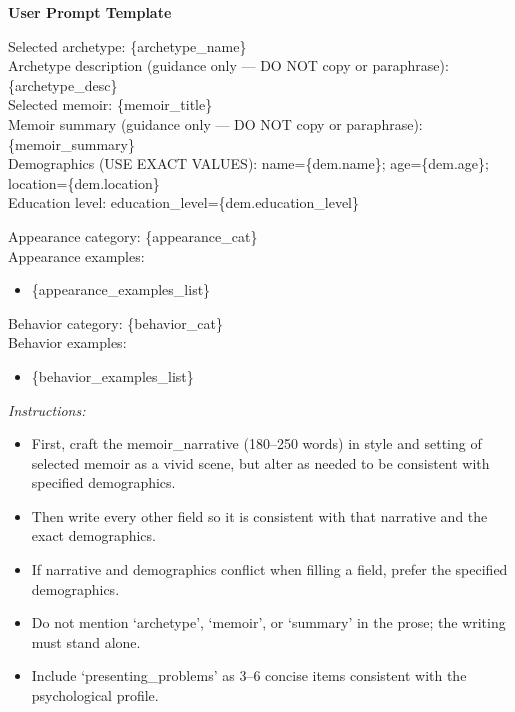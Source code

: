 \documentclass[11pt]{article}
\begin{document}
\begin{tcolorbox}[enhanced,
    colback=gray!5,
    colframe=black!75,
    fonttitle=\bfseries,
    title={Persona User Prompt Template},
    breakable,
    boxrule=0.6pt
]
\small
\textbf{User Prompt Template}\par
Selected archetype: \{archetype\_name\}\\
Archetype description (guidance only --- DO NOT copy or paraphrase): \{archetype\_desc\}\\
Selected memoir: \{memoir\_title\}\\
Memoir summary (guidance only --- DO NOT copy or paraphrase): \{memoir\_summary\}\\
Demographics (USE EXACT VALUES): name=\{dem.name\}; age=\{dem.age\}; location=\{dem.location\}\\
Education level: education\_level=\{dem.education\_level\}

\medskip
Appearance category: \{appearance\_cat\}\\
Appearance examples:
\begin{itemize}\itemsep2pt
\item \{appearance\_examples\_list\}
\end{itemize}

Behavior category: \{behavior\_cat\}\\
Behavior examples:
\begin{itemize}\itemsep2pt
\item \{behavior\_examples\_list\}
\end{itemize}

\textit{Instructions:}
\begin{itemize}\itemsep3pt
\item First, craft the memoir\_narrative (180--250 words) in style and setting of selected memoir as a vivid scene, but alter as needed to be consistent with specified demographics.
\item Then write every other field so it is consistent with that narrative and the exact demographics.
\item If narrative and demographics conflict when filling a field, prefer the specified demographics.
\item Do not mention `archetype', `memoir', or `summary' in the prose; the writing must stand alone.
\item Include `presenting\_problems' as 3--6 concise items consistent with the psychological profile.
\end{itemize}


\end{tcolorbox}
\end{document}
